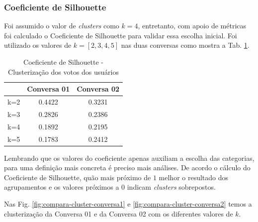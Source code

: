






\subsubsection{Coeficiente de Silhouette}

Foi assumido o valor de \textit{clusters} como $k=4$, entretanto, com apoio de métricas foi calculado o Coeficiente de Silhouette para validar essa escolha inicial. Foi utilizado os valores de $k=[2,3,4,5]$ nas duas conversas como mostra a Tab. \ref{tab:silhouette-usuarios}. 

\begin{table}[!h]
\centering
\label{tab:silhouette-usuarios} 
\begin{tabular}{|c|c|c|}
\hline
    & \textbf{Conversa 01} & \textbf{Conversa 02} \\ \hline
k=2 & 0.4422               & 0.3231               \\ \hline
k=3 & 0.2826               & 0.2386               \\ \hline
k=4 & 0.1892               & 0.2195               \\ \hline
k=5 & 0.1783               & 0.2412               \\ \hline
\end{tabular}
\caption{Coeficiente de Silhouette - Clusterização dos votos dos usuários}
\end{table}


Lembrando que os valores do coeficiente apenas auxiliam a escolha das categorias, para uma definição mais concreta é preciso mais análises. De acordo o cálculo do Coeficiente de Silhouette, quão mais próximo de $1$ melhor o resultado dos agrupamentos e os 	valores próximos a $0$ indicam \textit{clusters} sobrepostos. 


Nas Fig. \ref{fig:compara-cluster-conversa1} e \ref{fig:compara-cluster-conversa2} temos a clusterização da Conversa 01 e da Conversa 02 com os diferentes valores de $k$. 

